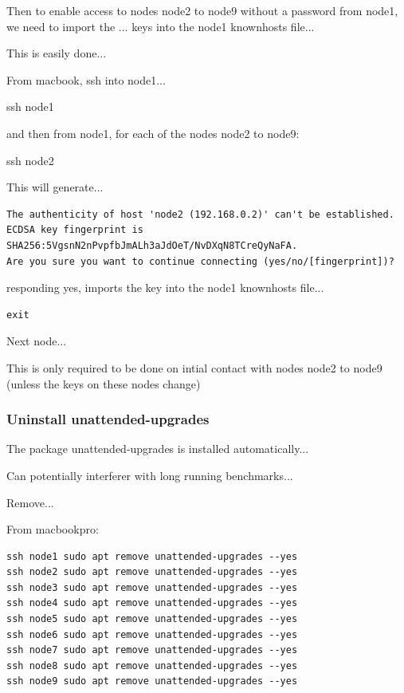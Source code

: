 \documentclass{article}
\begin{document}
Then to enable access to nodes node2 to node9 without a password from node1, we need to import the ... keys into the node1 knownhosts file...

This is easily done...

From macbook, ssh into node1...

ssh node1

and then from node1, for each of the nodes node2 to node9:

ssh node2

This will generate...

\lstset{frameround=tttt}
\begin{lstlisting}[frame=single]
The authenticity of host 'node2 (192.168.0.2)' can't be established.
ECDSA key fingerprint is SHA256:5VgsnN2nPvpfbJmALh3aJdOeT/NvDXqN8TCreQyNaFA.
Are you sure you want to continue connecting (yes/no/[fingerprint])?
\end{lstlisting}

responding yes, imports the key into the node1 knownhosts file...

\lstset{frameround=tttt}
\begin{lstlisting}[frame=single]
exit
\end{lstlisting}

Next node...

This is only required to be done on intial contact with nodes node2 to node9 (unless the keys on these nodes change)



\subsubsection{Uninstall unattended-upgrades}

The package unattended-upgrades is installed automatically...

Can potentially interferer with long running benchmarks...

Remove...

From macbookpro:

\lstset{frameround=tttt}
\begin{lstlisting}[frame=single]
ssh node1 sudo apt remove unattended-upgrades --yes
ssh node2 sudo apt remove unattended-upgrades --yes
ssh node3 sudo apt remove unattended-upgrades --yes
ssh node4 sudo apt remove unattended-upgrades --yes
ssh node5 sudo apt remove unattended-upgrades --yes
ssh node6 sudo apt remove unattended-upgrades --yes
ssh node7 sudo apt remove unattended-upgrades --yes
ssh node8 sudo apt remove unattended-upgrades --yes
ssh node9 sudo apt remove unattended-upgrades --yes
\end{lstlisting}
\end{document}
